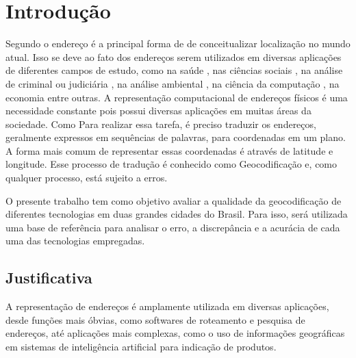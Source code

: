 \chapter{Introdução} \label{Introducao}








Segundo o \cite{Zamberg2009} endereço é a principal forma de de conceitualizar localização no mundo atual. Isso se deve ao fato dos endereços serem utilizados em diversas aplicações de diferentes campos de estudo, como na saúde \cite{AmericaJournal2001,Kypri2009,Mazumdar2008}, nas ciências sociais \cite{Chow2011}, na análise de criminal ou judiciária \cite{Olligschlaeger1998}, na análise ambiental \cite{Gilboa2006}, na ciência da computação \cite{Zamberg2009}, na economia \cite{Whitsel2006} entre outras.  
A representação computacional de endereços físicos é uma necessidade constante pois possui diversas aplicações em muitas áreas da sociedade. 
Como  Para realizar essa tarefa, é preciso traduzir os endereços, geralmente expressos em sequências de palavras, para coordenadas em um plano. A forma mais comum de representar essas coordenadas é através de latitude e longitude. Esse processo de tradução é conhecido como Geocodificação e, como qualquer processo, está sujeito a erros.

O presente trabalho tem como objetivo avaliar a qualidade da geocodificação de diferentes tecnologias em duas grandes cidades do Brasil. Para isso, será utilizada uma base de referência para analisar o erro, a discrepância e a acurácia de cada uma das tecnologias empregadas.

\section{Justificativa}

A representação de endereços é amplamente utilizada em diversas aplicações, desde funções mais óbvias, como softwares de roteamento e pesquisa de endereços, até aplicações mais complexas, como o uso de informações geográficas em sistemas de inteligência artificial para indicação de produtos.

